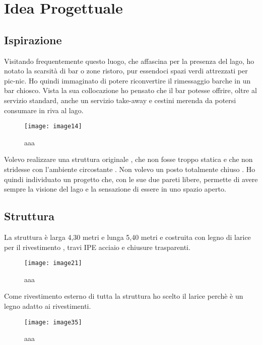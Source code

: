 \section{Idea Progettuale}

\subsection{Ispirazione}

Visitando frequentemente questo luogo, che affascina per la presenza del lago, ho notato la scarsità di bar o zone ristoro, pur essendoci spazi verdi attrezzati per pic-nic. 
Ho quindi immaginato di potere riconvertire il rimessaggio barche in un bar chiosco.
Vista la sua collocazione ho pensato che il bar potesse offrire, oltre al servizio standard, anche un servizio take-away e cestini merenda da potersi consumare in riva al lago.

\begin{figure}[H]
	\centering
	\texttt{[image: image14]}
	\caption{aaa}
	\label{fig:mesh1}
\end{figure}

Volevo realizzare una struttura  originale , che non fosse troppo statica e che non  stridesse con l’ambiente circostante .
Non volevo un posto totalmente  chiuso .
Ho quindi individuato un progetto che,  con  le sue due  pareti libere,  permette di avere sempre la visione del lago e la sensazione di essere in uno spazio aperto. 

\subsection{Struttura}

La struttura è larga 4,30 metri e lunga 5,40 metri  e costruita con legno di larice per il rivestimento , travi  IPE acciaio e chiusure trasparenti.

\begin{figure}[H]
	\centering
	\texttt{[image: image21]}
	\caption{aaa}
	\label{fig:mesh1}
\end{figure}


Come rivestimento esterno di tutta la struttura ho scelto il larice perchè è un legno adatto ai rivestimenti. 

\begin{figure}[H]
	\centering
	\texttt{[image: image35]}
	\caption{aaa}
	\label{fig:mesh1}
\end{figure}

